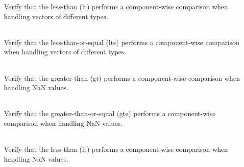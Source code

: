 \begin{DoxyRefList}
\label{test__test000060}%
%
Verify that the  less-\/than (lt) performs a component-\/wise comparison when handling vectors of different types.  
\item[{\parbox[t]{\linewidth}{Member \doxylink{group___f_g_m___vec4___l_t_e___comp_gafd67f17de1f8dc4847623501957a9be0}{Vector4\+DComparison\+\_\+\+Mixed\+Type\+\_\+\+Less\+Than\+Or\+Equal\+\_\+\+Returns\+Boolean\+Vector\+With\+Correct\+Values} ()}}]\hfill \\
\label{test__test000066}%
%
Verify that the  less-\/than-\/or-\/equal (lte) performs a component-\/wise comparison when handling vectors of different types.  
\item[{\parbox[t]{\linewidth}{Member \doxylink{group___f_g_m___vec4___g_t___comp_ga6561e269785dc47791e52a67a4eefb39}{Vector4\+DComparison\+\_\+\+Na\+NVector\+\_\+\+Greater\+Than\+\_\+\+Returns\+Boolean\+Vector\+With\+Correct\+Values} ()}}]\hfill \\
\label{test__test000047}%
%
Verify that the  greater-\/than (gt) performs a component-\/wise comparison when handling NaN values.  
\item[{\parbox[t]{\linewidth}{Member \doxylink{group___f_g_m___vec4___g_t_e___comp_ga0e50405ca0c67ea445d84349a4b1a26d}{Vector4\+DComparison\+\_\+\+Nan\+Vector\+\_\+\+Greater\+Than\+Or\+Equal\+\_\+\+Returns\+Boolean\+Vector\+With\+Correct\+Values} ()}}]\hfill \\
\label{test__test000053}%
%
Verify that the  greater-\/than-\/or-\/equal (gte) performs a component-\/wise comparison when handling NaN values.  
\item[{\parbox[t]{\linewidth}{Member \doxylink{group___f_g_m___vec4___l_t___comp_ga0435145d7a7fb23e428995ea416f25d6}{Vector4\+DComparison\+\_\+\+Nan\+Vector\+\_\+\+Less\+Than\+\_\+\+Returns\+Boolean\+Vector\+With\+Correct\+Values} ()}}]\hfill \\
\label{test__test000059}%
%
Verify that the  less-\/than (lt) performs a component-\/wise comparison when handling NaN values.  
\item[{\parbox[t]{\linewidth}{Member \doxylink{group___f_g_m___vec4___l_t_e___comp_gaf21f984e92f8867b0832d3e0cf5d1eb3}{Vector4\+DComparison\+\_\+\+Nan\+Vector\+\_\+\+Less\+Than\+Or\+Equal\+\_\+\+Returns\+Boolean\+Vector\+With\+Correct\+Values} ()}}]\hfill \\

\end{DoxyRefList}
